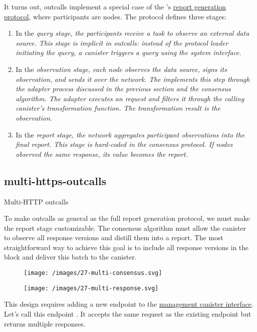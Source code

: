 \documentclass{article}
\begin{document}
It turns out,  outcalls implement a special case of the 's \href{/posts/24-ocr.html#report-generation}{report generation protocol}, where participants are  nodes.
The  protocol defines three stages:
\begin{enumerate}
    \item
    In the \em{query} stage, the participants receive a task to observe an external data source.
    This stage is implicit in  outcalls: instead of the protocol leader initiating the query, a canister triggers a query using the system interface.
    \item
    In the \em{observation} stage, each node observes the data source, signs its observation, and sends it over the network.
    The  implements this step through the adapter process discussed in the previous section and the consensus algorithm.
    The adapter executes an  request and filters it through the calling canister's transformation function.
    The transformation result is the observation.
    \item In the \em{report} stage, the network aggregates participant observations into the final report.
    This stage is hard-coded in the  consensus protocol.
    If  nodes observed the same  response, its value becomes the report.
\end{enumerate}

\subsection{multi-https-outcalls}{Multi-HTTP outcalls}

To make  outcalls as general as the full report generation protocol, we must make the report stage customizable.
The  consensus algorithm must allow the canister to observe all response versions and distill them into a report.
The most straightforward way to achieve this goal is to include all response versions in the block and deliver this batch to the canister.

\begin{figure}[grayscale-diagram,p75]
\texttt{[image: /images/27-multi-consensus.svg]}
\end{figure}

\begin{figure}[grayscale-diagram,p75]
\texttt{[image: /images/27-multi-response.svg]}
\end{figure}

This design requires adding a new endpoint to the \href{https://internetcomputer.org/docs/current/references/ic-interface-spec/#ic-management-canister}{management canister interface}.
Let's call this endpoint .
It accepts the same request as the existing \href{https://internetcomputer.org/docs/current/references/ic-interface-spec/#ic-http_request}{} endpoint but returns multiple responses.
\end{document}
